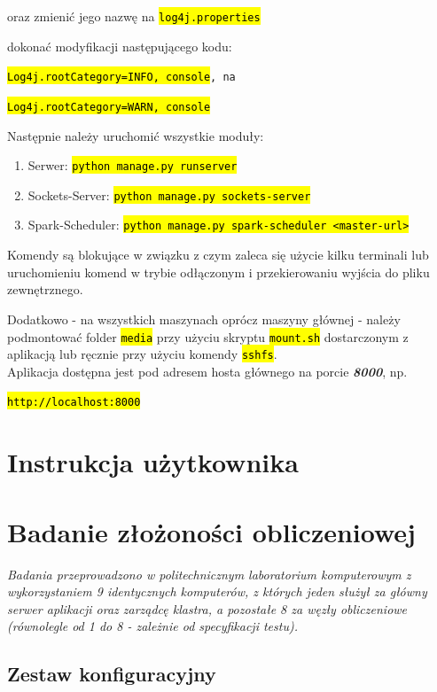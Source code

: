 \documentclass[a4paper,onecolumn,oneside,12pt]{memoir}
\begin{document}
{{\begin{framed}
oraz zmienić jego nazwę na \texttt{\hl{log4j.properties}} 
\end{framed}
dokonać modyfikacji  następującego kodu: \\ \vspace{2mm}
  \centerline{\texttt{\hl{Log4j.rootCategory=INFO, console}, na}}
  \centerline{\texttt{\hl{Log4j.rootCategory=WARN, console}}}\vspace{2mm}

Następnie należy uruchomić wszystkie moduły:
\begin{enumerate}
\item Serwer: \texttt{\hl{python manage.py runserver}}
\item Sockets-Server: \texttt{\hl{python manage.py sockets-server}}
\item Spark-Scheduler: \texttt{\hl{python manage.py spark-scheduler <master-url>}}
\end{enumerate}

Komendy są blokujące w związku z czym zaleca się użycie kilku terminali lub uruchomieniu
komend w trybie odłączonym i przekierowaniu wyjścia do pliku zewnętrznego.\vspace{2mm}

Dodatkowo - na wszystkich maszynach oprócz maszyny głównej - należy podmontować folder
\texttt{\hl{media}} przy użyciu skryptu \texttt{\hl{mount.sh}} dostarczonym z aplikacją lub ręcznie przy użyciu
komendy \texttt{\hl{sshfs}}.\\
\vspace{2mm} Aplikacja dostępna jest pod adresem hosta głównego na porcie \textbf{\textit{8000}}, np.\\
\centerline{\texttt{\hl{http://localhost:8000}}}
\chapter{Instrukcja użytkownika}


\chapter{Badanie złożoności obliczeniowej}
\emph{Badania przeprowadzono w politechnicznym laboratorium komputerowym z wykorzystaniem 9 identycznych komputerów, z których jeden służył za główny serwer aplikacji oraz zarządcę klastra, a pozostałe 8 za węzły obliczeniowe (równolegle od 1 do 8 - zależnie od specyfikacji testu).}

\section{Zestaw konfiguracyjny}

}}
\end{document}
